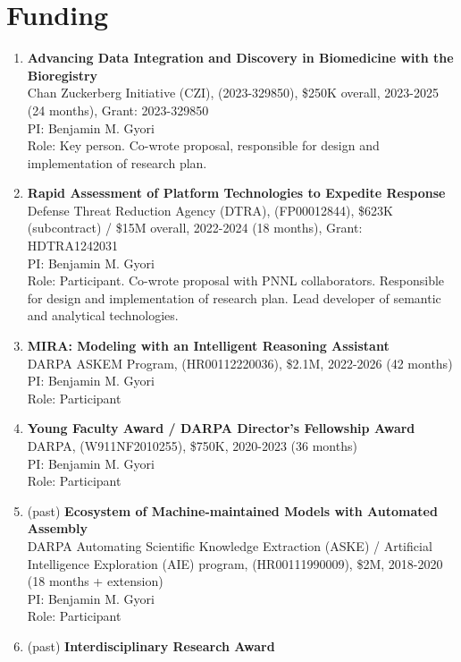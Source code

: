 \documentclass[10pt,a4paper,sans]{moderncv} %
\begin{document}
\section{Funding}
    \begin{enumerate}
    \itemsep0.75em
    \item  \textbf{Advancing Data Integration and Discovery in Biomedicine with the Bioregistry}\\
        Chan Zuckerberg Initiative (CZI), (2023-329850), \$250K overall, 2023-2025 (24 months), Grant: 2023-329850\\
        PI: Benjamin M. Gyori\\
        Role: Key person. Co-wrote proposal, responsible for design and implementation of research plan.
    \item  \textbf{Rapid Assessment of Platform Technologies to Expedite Response}\\
        Defense Threat Reduction Agency (DTRA), (FP00012844), \$623K (subcontract) / \$15M overall, 2022-2024 (18 months), Grant: HDTRA1242031\\
        PI: Benjamin M. Gyori\\
        Role: Participant. Co-wrote proposal with PNNL collaborators. Responsible for design and implementation of research plan. Lead developer of semantic and analytical technologies.
    \item  \textbf{MIRA: Modeling with an Intelligent Reasoning Assistant}\\
        DARPA ASKEM Program, (HR00112220036), \$2.1M, 2022-2026 (42 months)\\
        PI: Benjamin M. Gyori\\
        Role: Participant
    \item  \textbf{Young Faculty Award / DARPA Director’s Fellowship Award}\\
        DARPA, (W911NF2010255), \$750K, 2020-2023 (36 months)\\
        PI: Benjamin M. Gyori\\
        Role: Participant
    \item (past) \textbf{Ecosystem of Machine-maintained Models with Automated Assembly}\\
        DARPA Automating Scientific Knowledge Extraction (ASKE) / Artificial Intelligence Exploration (AIE) program, (HR00111990009), \$2M, 2018-2020 (18 months + extension)\\
        PI: Benjamin M. Gyori\\
        Role: Participant
    \item (past) \textbf{Interdisciplinary Research Award}\\

\end{enumerate}
\end{document}

